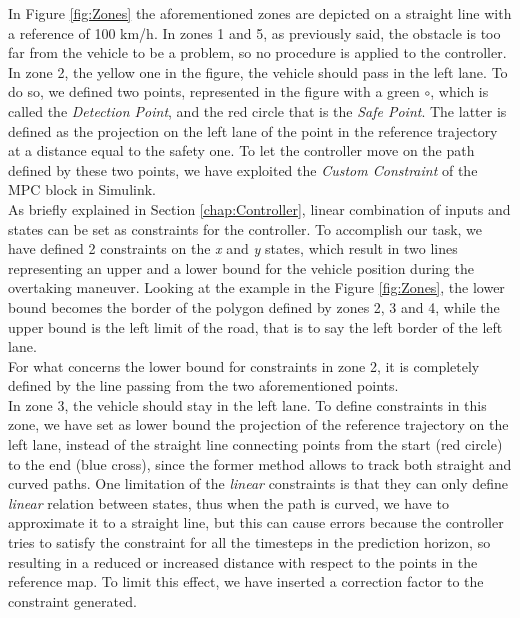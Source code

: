 In Figure \ref{fig:Zones} the aforementioned zones are depicted on a straight line with a reference of 100 km/h. In zones 1 and 5, as previously said, the obstacle is too far from the vehicle to be a problem, so no procedure is applied to the controller.
In zone 2, the yellow one in the figure, the vehicle should pass in the left lane. To do so, we defined two points, represented in the figure with a green $\circ$, which is called the \textit{Detection Point}, and the red circle that is the \textit{Safe Point}. The latter is defined as the projection on the left lane of the point in the reference trajectory at a distance equal to the safety one. To let the controller move on the path defined by these two points, we have exploited the \textit{Custom Constraint} of the MPC block in Simulink.\\
As briefly explained in Section \ref{chap:Controller}, linear combination of inputs and states can be set as constraints for the controller. To accomplish our task, we have defined 2 constraints on the \textit{x} and \textit{y} states, which result in two lines representing an upper and a lower bound for the vehicle position during the overtaking maneuver. Looking at the example in the Figure \ref{fig:Zones}, the lower bound becomes the border of the polygon defined by zones 2, 3 and 4, while the upper bound is the left limit of the road, that is to say the left border of the left lane.\\
For what concerns the lower bound for constraints in zone 2, it is completely defined by the line passing from the two aforementioned points.\\
In zone 3, the vehicle should stay in the left lane. To define constraints in this zone, we have set as lower bound the projection of the reference trajectory on the left lane, instead of the straight line connecting points from the start (red circle) to the end (blue cross), since the former method allows to track both straight and curved paths. One limitation of the \textit{linear} constraints is that they can only define \textit{linear} relation between states, thus when the path is curved, we have to approximate it to a straight line, but this can cause errors because the controller tries to satisfy the constraint for all the timesteps in the prediction horizon, so resulting in a reduced or increased distance with respect to the points in the reference map. To limit this effect, we have inserted a correction factor to the constraint generated.

